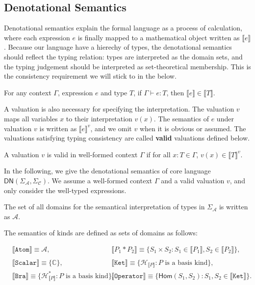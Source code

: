 \documentclass[manuscript, review, timestamp]{acmart}
\newcommand*{\sem}[1]{{\llbracket #1 \rrbracket}}
\begin{document}
\subsection{Denotational Semantics}

Denotational semantics explain the formal language as a process of calculation, where each expression $e$ is finally mapped to a mathematical object written as $\sem{e}$.
Because our language have a hierechy of types, the denotational semantics should reflect the typing relation: types are interpreted as the domain sets, and the typing judgement should be interpreted as set-theoretical membership. This is the consistency requirement we will stick to in the below.

\begin{definition}
  For any context $\Gamma$, expression $e$ and type $T$, if $\Gamma \vdash e : T$, then $\sem{e} \in \sem{T}$.
\end{definition}

A valuation is also necessary for specifying the interpretation. The valuation $v$ maps all variables $x$ to their interpretation $v(x)$. The semantics of $e$ under valuation $v$ is written as $\sem{e}^v$, and we omit $v$ when it is obvious or assumed.
The valuations satisfying typing consistency are called \textbf{valid} valuations defined below.
\begin{definition}
  A valuation $v$ is valid in well-formed context $\Gamma$ if for all $x : T \in \Gamma$, $v(x) \in \sem{T}^v$.
\end{definition}

In the following, we give the denotational semantics of core language $\textsf{DN}(\Sigma_\mathcal{A}, \Sigma_\mathcal{C})$. We assume a well-formed context $\Gamma$ and a valid valuation $v$, and only consider the well-typed expressions.

\begin{definition}
  The set of all domains for the semantical interpretation of types in $\Sigma_{\mathcal{A}}$ is written as $\mathcal{A}$.
\end{definition}

\begin{definition} The semantics of kinds are defined as sets of domains as follows:

  \begin{align*}
    & \sem{\texttt{Atom}} \equiv \mathcal{A},
    \qquad
    && \sem{P_1 * P_2} \equiv \{ S_1 \times S_2 : S_1 \in \sem{P_1}, S_2 \in \sem{P_2} \}, \\
    \\
    & \sem{\texttt{Scalar}} \equiv \{ \mathbb{C} \},
    \qquad
    && \sem{\texttt{Ket}} \equiv \{ \mathcal{H}_{\sem{P}} : P \text{ is a basis kind} \}, \\
    & \sem{\texttt{Bra}} \equiv \{ \mathcal{H}^*_{\sem{P}} : P \text{ is a basis kind} \},
    \qquad
    && \sem{\texttt{Operator}} \equiv \{ \textsf{Hom}(S_1, S_2) : S_1, S_2 \in \sem{\texttt{Ket}} \}.
  \end{align*}
\end{definition}
\end{document}
